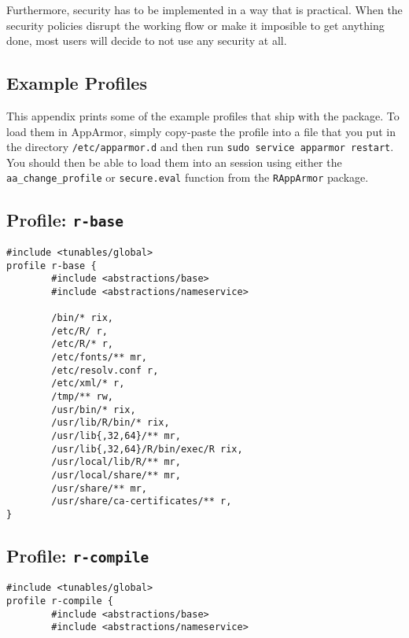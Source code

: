 \documentclass[article]{jss}
\begin{document}
Furthermore, security has to be implemented in a way that is practical. When the
security policies disrupt the working flow or make it imposible to get anything
done, most users will decide to not use any security at all. 


\newpage

\begin{appendices}
\section{Example Profiles}

This appendix prints some of the example profiles that ship with the
 package. To load them in AppArmor, simply copy-paste the
profile into a file that you put in the directory \texttt{/etc/apparmor.d} and
then run \texttt{sudo service apparmor restart}. You should then be able to load
them into an  session using either the \texttt{aa\_change\_profile}
or \texttt{secure.eval} function from the \texttt{RAppArmor} package.

\subsection[Profile: r-base]{Profile: \texttt{r-base}}
\label{r-base}

\begin{verbatim}
#include <tunables/global>
profile r-base {
        #include <abstractions/base>
        #include <abstractions/nameservice>

        /bin/* rix,
        /etc/R/ r,
        /etc/R/* r,
        /etc/fonts/** mr,
        /etc/resolv.conf r,
        /etc/xml/* r,
        /tmp/** rw,
        /usr/bin/* rix,
        /usr/lib/R/bin/* rix,
        /usr/lib{,32,64}/** mr,
        /usr/lib{,32,64}/R/bin/exec/R rix,
        /usr/local/lib/R/** mr,
        /usr/local/share/** mr,
        /usr/share/** mr,
        /usr/share/ca-certificates/** r,
}
\end{verbatim}


\subsection[Profile: r-compile]{Profile: \texttt{r-compile}}
\label{r-compile}

\begin{verbatim}
#include <tunables/global>
profile r-compile {
        #include <abstractions/base>
        #include <abstractions/nameservice>


\end{verbatim}
\end{appendices}
\end{document}
